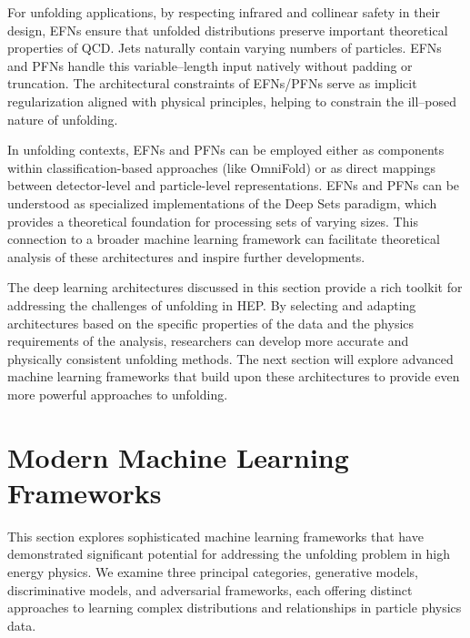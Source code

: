         For unfolding applications, by respecting infrared and collinear safety in their design, EFNs ensure that unfolded distributions preserve important theoretical properties of QCD.
        Jets naturally contain varying numbers of particles.
        EFNs and PFNs handle this variable--length input natively without padding or truncation.
        The architectural constraints of EFNs/PFNs serve as implicit regularization aligned with physical principles, helping to constrain the ill--posed nature of unfolding.

        In unfolding contexts, EFNs and PFNs can be employed either as components within classification-based approaches (like OmniFold) or as direct mappings between detector-level and particle-level representations.
        EFNs and PFNs can be understood as specialized implementations of the Deep Sets paradigm, which provides a theoretical foundation for processing sets of varying sizes.
        This connection to a broader machine learning framework can facilitate theoretical analysis of these architectures and inspire further developments.


The deep learning architectures discussed in this section provide a rich toolkit for addressing the challenges of unfolding in HEP.
%
By selecting and adapting architectures based on the specific properties of the data and the physics requirements of the analysis, researchers can develop more accurate and physically consistent unfolding methods.
%
The next section will explore advanced machine learning frameworks that build upon these architectures to provide even more powerful approaches to unfolding.

\section{Modern Machine Learning Frameworks}
This section explores sophisticated machine learning frameworks that have demonstrated significant potential for addressing the unfolding problem in high energy physics.
%
We examine three principal categories, generative models, discriminative models, and adversarial frameworks, each offering distinct approaches to learning complex distributions and relationships in particle physics data.
